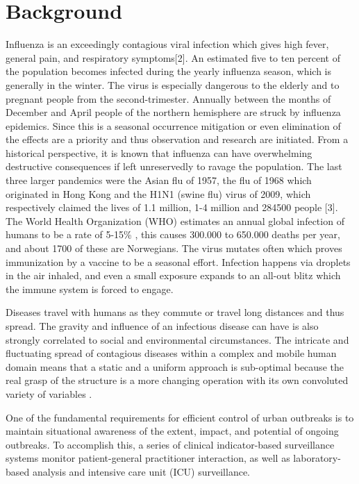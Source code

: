 \section{Background}
Influenza is an exceedingly contagious viral infection which gives high fever, general pain, and respiratory symptoms[2]. An estimated five to ten percent of the population becomes infected during the yearly influenza season, which is generally in the winter. The virus is especially dangerous to the elderly and to pregnant people from the second-trimester. Annually between the months of December and April people of the northern hemisphere are struck by influenza epidemics. Since this is a seasonal occurrence mitigation or even elimination of the effects are a priority and thus observation and research are initiated. From a historical perspective, it is known that influenza can have overwhelming destructive consequences if left unreservedly to ravage the population. The last three larger pandemics were the Asian flu of 1957, the flu of 1968 which originated in Hong Kong and the H1N1 (swine flu) virus of 2009, which respectively claimed the lives of 1.1 million, 1-4 million and 284500 people [3]. The World Health Organization (WHO) estimates an annual global infection of humans to be a rate of 5-15\% \cite{who2017}, this causes 300.000 to 650.000 deaths per year\cite{iuliano2017estimates}, and about 1700 of these are Norwegians\cite{niph}. The virus mutates often which proves immunization by a vaccine to be a seasonal effort. Infection happens via droplets in the air inhaled, and even a small exposure expands to an all-out blitz which the immune system is forced to engage.

Diseases travel with humans as they commute or travel long distances and thus spread\cite{poletto2013human}\cite{wibisono2008non}. The gravity and influence of an infectious disease can have is also strongly correlated to social\cite{yang2017characterizing} and environmental\cite{robertson2017towards} circumstances. The intricate and fluctuating spread of contagious diseases within a complex and mobile human domain means that a static and a uniform approach is sub-optimal because the real grasp of the structure is a more changing operation with its own convoluted variety of variables \cite{spatiotemp_urban_sys}\cite{enduri2018dynamics}.

One of the fundamental requirements for efficient control of urban outbreaks is to maintain situational awareness of the extent, impact, and potential of ongoing outbreaks. To accomplish this, a series of clinical indicator-based surveillance systems monitor patient-general practitioner interaction, as well as laboratory-based analysis and intensive care unit (ICU) surveillance. 

